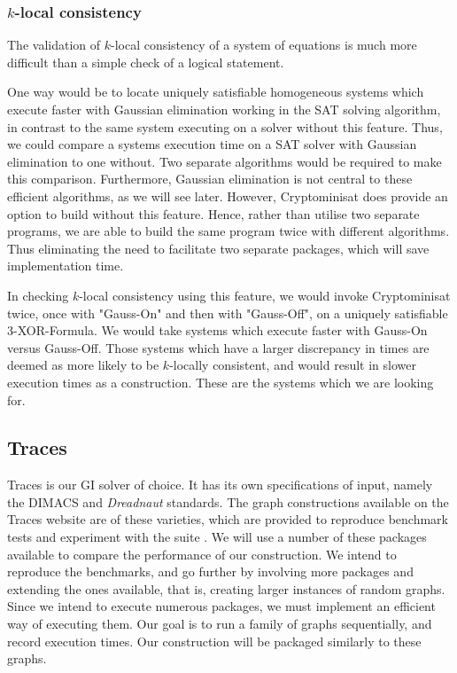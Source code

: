 \subsubsection{$k$-local consistency}
The validation of $k$-local consistency of a system of equations is much more difficult than a simple check of a logical statement. 
\par
One way would be to locate uniquely satisfiable homogeneous systems which execute faster with Gaussian elimination working in the SAT solving algorithm, in contrast to the same system executing on a solver without this feature. Thus, we could compare a systems execution time on a SAT solver with Gaussian elimination to one without. Two separate algorithms would be required to make this comparison. Furthermore, Gaussian elimination is not central to these efficient algorithms, as we will see later. However, Cryptominisat does provide an option to build without this feature. Hence, rather than utilise two separate programs, we are able to build the same program twice with different algorithms. Thus eliminating the need to facilitate two separate packages, which will save implementation time.
\par
In checking $k$-local consistency using this feature, we would invoke Cryptominisat twice, once with "Gauss-On" and then with "Gauss-Off", on a uniquely satisfiable 3-XOR-Formula. We would take systems which execute faster with Gauss-On versus Gauss-Off. Those systems which have a larger discrepancy in times are deemed as more likely to be $k$-locally consistent, and would result in slower execution times as a construction. These are the systems which we are looking for.  

\newpage
\subsection{Traces}
Traces is our GI solver of choice. It has its own specifications of input, namely the DIMACS and \emph{Dreadnaut} standards. The graph constructions available on the Traces website are of these varieties, which are provided to reproduce benchmark tests and experiment with the suite \cite{piperno_2017}. We will use a number of these packages available to compare the performance of our construction. We intend to reproduce the benchmarks, and go further by involving more packages and extending the ones available, that is, creating larger instances of random graphs. Since we intend to execute numerous packages, we must implement an efficient way of executing them. Our goal is to run a family of graphs sequentially, and record execution times. Our construction will be packaged similarly to these graphs.

